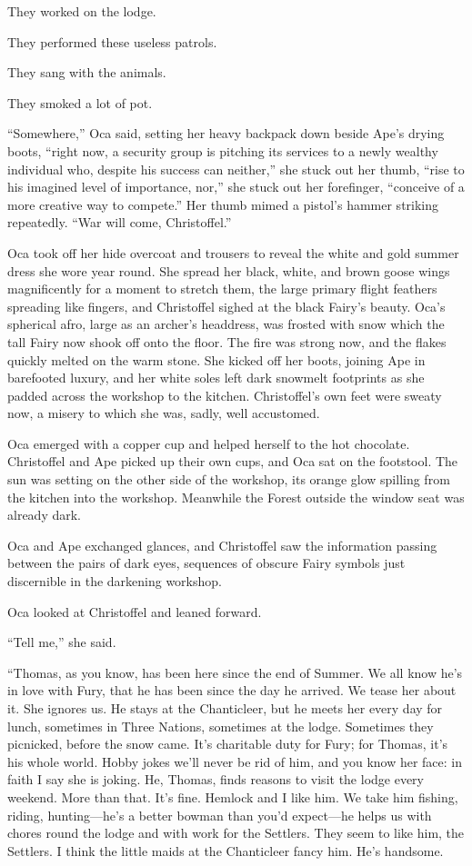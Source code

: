 \documentclass[11pt,a5paper]{article}
\begin{document}
They worked on the lodge.

They performed these useless patrols.

They sang with the animals.

They smoked a lot of pot.

``Somewhere,'' Oca said, setting her heavy backpack down beside Ape's drying boots, ``right now, a security group is pitching its services to a newly wealthy individual who, despite his success can neither,'' she stuck out her thumb, ``rise to his imagined level of importance, nor,'' she stuck out her forefinger, ``conceive of a more creative way to compete.'' Her thumb mimed a pistol's hammer striking repeatedly. ``War will come, Christoffel.''

Oca took off her hide overcoat and trousers to reveal the white and gold summer dress she wore year round. She spread her black, white, and brown goose wings magnificently for a moment to stretch them, the large primary flight feathers  spreading like fingers, and Christoffel sighed at the black Fairy's beauty. Oca's spherical afro, large as an archer's headdress, was frosted with snow which the tall Fairy now shook off onto the floor. The fire was strong now, and the flakes quickly melted on the warm stone. She kicked off her boots, joining Ape in barefooted luxury, and her white soles left dark snowmelt footprints as she padded across the workshop to the kitchen. Christoffel's own feet were sweaty now, a misery to which she was, sadly, well accustomed.

Oca emerged with a copper cup and helped herself to the hot chocolate. Christoffel and Ape picked up their own cups, and Oca sat on the footstool. The sun was setting on the other side of the workshop, its orange glow spilling from the kitchen into the workshop. Meanwhile the Forest outside the window seat was already dark.

Oca and Ape exchanged glances, and Christoffel saw the information passing between the pairs of dark eyes, sequences of obscure Fairy symbols just discernible in the darkening workshop.

Oca looked at Christoffel and leaned forward.

``Tell me,'' she said.

\vspace{1em}

``Thomas, as you know, has been here since the end of Summer. We all know he's in love with Fury, that he has been since the day he arrived. We tease her about it. She ignores us. He stays at the Chanticleer, but he meets her every day for lunch, sometimes in Three Nations, sometimes at the lodge. Sometimes they picnicked, before the snow came. It's charitable duty for Fury; for Thomas, it's his whole world. Hobby jokes we'll never be rid of him, and you know her face: in faith I say she is joking. He, Thomas, finds reasons to visit the lodge every weekend. More than that. It's fine. Hemlock and I like him. We take him fishing, riding, hunting---he's a better bowman than you'd expect---he helps us with chores round the lodge and with work for the Settlers. They seem to like him, the Settlers. I think the little maids at the Chanticleer fancy him. He's handsome.
\end{document}

